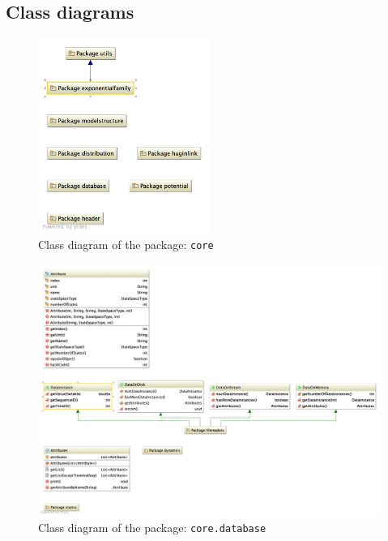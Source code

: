 \subsection{Class diagrams}
\label{classDiagrams}


\begin{figure}[h!]
  \caption{Class diagram of the package: \texttt{core}}
  \centering
    \includegraphics[width=0.5\textwidth]{ClassDiagrams/core.jpg}
\end{figure}

\begin{figure}[h!]
  \caption{Class diagram of the package: \texttt{core.database}}
  \centering
    \includegraphics[width=\textwidth]{ClassDiagrams/core_database.jpg}
\end{figure}

